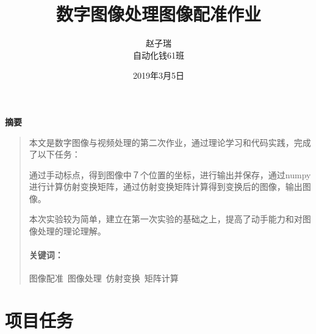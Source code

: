 \documentclass[UTF8]{ctexart}
\title{数字图像处理图像配准作业}
\author{赵子瑞 \\ 自动化钱61班}
\date{2019年3月5日}
\newcommand{\xiaosi}{\fontsize{11.6pt}{\baselineskip}\selectfont}
\newcommand{\sihao}{\fontsize{12.1pt}{\baselineskip}\selectfont}
\begin{document}
\maketitle

\newenvironment{cnabandkey}[2][\sihao 摘要] %
{\newcommand{\ckeywords}{#2} %
	\begin{center} \bfseries #1 \end{center} %
	\begin{quotation}
	}{\paragraph{\sihao 关键词：} \textrm{\ckeywords} %
	\end{quotation}
}

\newenvironment{enabandkey}[2][\sihao Abstract] %
{\newcommand{\ekeywords}{#2} %
	\begin{center} \bfseries #1 \end{center} %
	\begin{quotation}
	}{\paragraph{\sihao Keywords：} \textrm{\ekeywords} %
	\end{quotation}
}

	\begin{cnabandkey}{图像配准\, 图像处理\, 仿射变换\, 矩阵计算}
        \xiaosi
        \hspace{0.25em}本文是数字图像与视频处理的第二次作业，通过理论学习和代码实践，完成了以下任务：
        
		通过手动标点，得到图像中７个位置的坐标，进行输出并保存，通过numpy进行计算仿射变换矩阵，通过仿射变换矩阵计算得到变换后的图像，输出图像。
		
		本次实验较为简单，建立在第一次实验的基础之上，提高了动手能力和对图像处理的理论理解。
		
	\end{cnabandkey}
	
	\clearpage
	
\begin{spacing}{1.2} %
\xiaosi\tableofcontents\newpage
\end{spacing}


\xiaosi
\section{项目任务}
\end{document}
